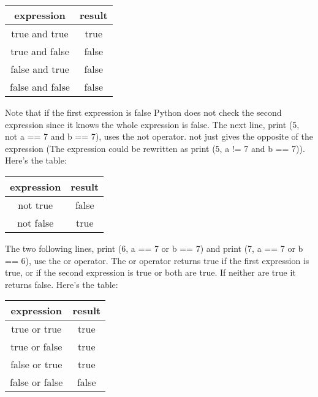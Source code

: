 \begin{tabular}{|c|c|}
\hline
expression&	result\\
\hline
true and true	&true\\
\hline
true and false	&false\\
\hline
false and true	&false\\
\hline
false and false	&false\\
\hline
\end{tabular}

Note that if the first expression is false Python does not check the second
expression since it knows the whole expression is false.  The next line, print
(5, not a == 7 and b == 7), uses the not operator. not just gives the opposite
of the expression (The expression could be rewritten as print (5, a != 7 and b
== 7)). Here's the table:

\begin{tabular}{|c|c|}
\hline
expression	&result\\
\hline
not true	&false\\
\hline
not false	&true\\
\hline
\end{tabular}

The two following lines, print (6, a == 7 or b == 7) and print (7, a == 7 or b
== 6), use the or operator. The or operator returns true if the first expression
is true, or if the second expression is true or both are true. If neither are
true it returns false. Here's the table:

\begin{tabular}{|c|c|}
\hline
expression&	result\\
\hline
true or true	&true\\
\hline
true or false	&true\\
\hline
false or true	&true\\
\hline
false or false	&false\\
\hline
\end{tabular}

